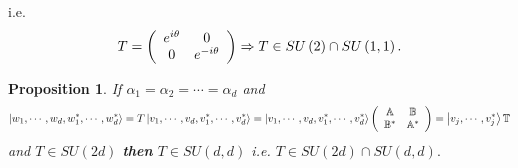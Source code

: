 \documentclass[aps,preprint]{revtex4}%
\newtheorem{proposition}[theorem]{Proposition}
\begin{document}
i.e.%
\begin{equation}
T=\left(
\begin{array}
[c]{cc}%
e^{i\theta} & 0\\
0 & e^{-i\theta}%
\end{array}
\right)  \Rightarrow T\in SU\left(  2\right)  \cap SU\left(  1,1\right)  .
\end{equation}


\begin{proposition}
If $\alpha_{1}=\alpha_{2}=\cdots=\alpha_{d}$ and
\begin{equation}
\left\vert w_{1},\cdots,w_{d},w_{1}^{\ast},\cdots,w_{d}^{\ast}\right\rangle
=T\left\vert v_{1},\cdots,v_{d},v_{1}^{\ast},\cdots,v_{d}^{\ast}\right\rangle
=\left\vert v_{1},\cdots,v_{d},v_{1}^{\ast},\cdots,v_{d}^{\ast}\right\rangle
\left(
\begin{array}
[c]{cc}%
\mathbb{A} & \mathbb{B}\\
\mathbb{B}^{\ast} & \mathbb{A}^{\ast}%
\end{array}
\right)  =\left\vert v_{j},\cdots,v_{j}^{\ast}\right\rangle \mathbb{T}%
\end{equation}
and $T\in SU\left(  2d\right)  $ \textbf{then} $T\in SU\left(  d,d\right)  $
i.e. $T\in SU\left(  2d\right)  \cap SU\left(  d,d\right)  .$
\end{proposition}
\end{document}
